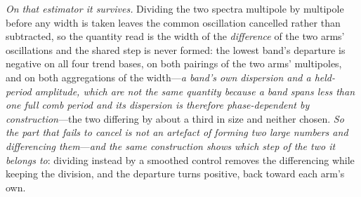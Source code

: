 \documentclass[11pt,a4paper]{article}
\theoremstyle{plain}
\theoremstyle{definition}
\theoremstyle{remark}
\begin{document}
\emph{On that estimator it survives.} Dividing the two spectra multipole by multipole before any width is
taken leaves the common oscillation cancelled rather than subtracted, so the quantity read is the width of
the \emph{difference} of the two arms' oscillations and the shared step is never formed: the lowest band's
departure is negative on all four trend bases, on both pairings of the two arms' multipoles, and on both
aggregations of the width---\emph{a band's own dispersion and a held-period amplitude, which are not the same
quantity because a band spans less than one full comb period and its dispersion is therefore phase-dependent
by construction}---the two differing by about a third in size and neither chosen. \emph{So the part that
fails to cancel is not an artefact of forming two large numbers and differencing them}---\emph{and the same
construction shows which step of the two it belongs to}: dividing instead by a smoothed control removes the
differencing while keeping the division, and the departure turns positive, back toward each arm's own.
\end{document}
